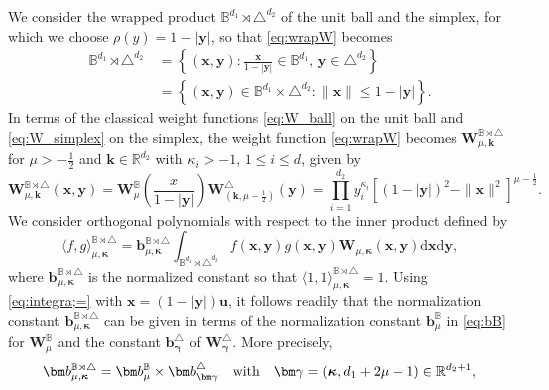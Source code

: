\documentclass{amsart}
\theoremstyle{remark}
\def\la{{\langle}}
\def\ra{{\rangle}}
\def\d{\mathrm{d}}
\def\k{{\kappa}}
\def\la{{\langle}}
\def\ra{{\rangle}}
\def\bb{{\bm b}}
\def\kb{{\bm k}}
\def\xb{{\bm x}}
\def\yb{{\bm y}}
\def\Wb{{\bm W}}
\def\BB{{\mathbb B}}
\def\RR{{\mathbb R}}
\def\bk{{\boldsymbol{\kappa}}}
\def\f{\frac}
\begin{document}
We consider the wrapped product $\BB^{d_1}\!\! \rtimes \triangle^{d_2}$ of the unit ball and the simplex,
for which we choose $\rho(y) = 1-|\yb|$, so that \eqref{eq:wrapW} becomes  
\begin{align*}
\BB^{d_1}\!\! \rtimes\triangle^{d_2} \, & = \left\{(\xb,\yb): \frac{\xb}{1-|\yb|} \in \BB^{d_1}, \, \yb \in \triangle^{d_2}\right\} \\
   & = \left\{(\xb,\yb) \in \BB^{d_1}\! \times \! \triangle^{d_2}: \|\xb\| \le 1-|\yb| \right\}.
\end{align*}
In terms of the classical weight functions \eqref{eq:W_ball} on the unit ball and \eqref{eq:W_simplex} on the simplex,
the weight function \eqref{eq:wrapW} becomes $\Wb_{\mu, \kb}^{\BB\rtimes \triangle}$ for $\mu > -\f12$ 
and $\kb \in \RR^{d_2}$ with $\k_i > -1$, $1\le i \le d$, given by
\begin{equation} \label{eq:Weight-BS}
\Wb_{\mu, \kb}^{\BB\rtimes \triangle}(\xb,\yb) = \Wb_{\mu}^{\BB} \left( \frac{x}{1-|\bm y|} \right) \Wb_{(\kb, \mu-\f12)}^\triangle(\yb)
=  \prod_{i=1}^{d_2} y_i^{\k_i} \left[ (1-|\bm y|)^2- \|\bm x\|^2 \right]^{\mu - \f12}.
\end{equation}
We consider orthogonal polynomials with respect to the inner product defined by
\begin{equation} \label{eq:ipdOmega}
  \la f, g\ra_{\mu, \bk}^{\BB\rtimes \triangle}
    = \bm b_{\mu,\bk}^{\BB\rtimes \triangle}
        \int_{\BB^{d_1} \rtimes \triangle^{d_2}} f(\bm x,\bm y) g(\bm x,\bm y) \bm W_{\mu,\bk}(\bm x,\bm y) \d \bm x \d \bm y, 
\end{equation}
where $\bb_{\mu,\bk}^{\BB\rtimes \triangle}$ is the normalized constant so that $\la 1, 1\ra_{\mu, \bk}^{\BB\rtimes \triangle} =1$. 
Using \eqref{eq:integra;=} with $\bm x = (1- | \bm y|) \bm u$, it follows readily that the normalization constant 
$\bb_{\mu,\bk}^{\BB\rtimes \triangle}$ can be given in terms of the normalization constant $\bm b_\mu^\BB$ 
in \eqref{eq:bB} for $\bm W_\mu^\BB$ and the constant $\bm b_{\bm \gamma}^\triangle$ of 
$\bm W_{\bm \gamma}^\triangle$. More precisely, 
\begin{equation} \label{eq:bOmega}
  \bm b_{\mu,\bk}^{\BB\rtimes \triangle} = \bm b^\BB_\mu \times \bm b^\triangle_{\bm \gamma} 
       \quad\hbox{with}\quad \bm \gamma = (\bk, d_1+ 2\mu -1) \in \RR^{d_2+1}, 
\end{equation}
\end{document}
